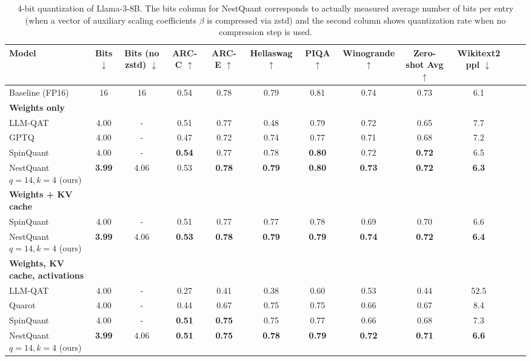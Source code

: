 \documentclass{article}
\newif\ifisicml
\theoremstyle{plain}
\theoremstyle{definition}
\theoremstyle{remark}
\begin{document}
\ifisicml
\else
\begin{table}[h]
\centering
\begin{adjustbox}{max width=\textwidth} %
\begin{tabular}{lccccccccccc}
    \toprule
\textbf{Model} & \textbf{Bits} $\downarrow$ & \textbf{Bits (no zstd)} $\downarrow$ & \textbf{ARC-C} $\uparrow$ & \textbf{ARC-E} $\uparrow$ & \textbf{Hellaswag} $\uparrow$ &  \textbf{PIQA} $\uparrow$ & \textbf{Winogrande} $\uparrow$ & \textbf{Zero-shot Avg} $\uparrow$ & \textbf{Wikitext2 ppl} $\downarrow$ \\ 
\midrule
    Baseline (FP16) & 16 & 16 & 0.54 & 0.78 & 0.79 & 0.81 & 0.74 & 0.73& 6.1\\
    \midrule
    \textbf{Weights only} \\
    LLM-QAT & 4.00 & - & 0.51 & 0.77 & 0.48 & 0.79 & 0.72 & 0.65 & 7.7\\
    GPTQ & 4.00 & - & 0.47 & 0.72 & 0.74 & 0.77 & 0.71 & 0.68 & 7.2\\
    SpinQuant          & 4.00& -&\textbf{0.54}& 0.77& 0.78 & \textbf{0.80}& 0.72& \textbf{0.72}& 6.5\\
    NestQuant $q=14,k=4$ (ours)           & \textbf{3.99}& 4.06 & 0.53 & \textbf{0.78} & \textbf{0.79} & \textbf{0.80} & \textbf{0.73} & \textbf{0.72}& \textbf{6.3}\\
    \midrule
    \textbf{Weights + KV cache} \\
    SpinQuant & 4.00& - & 0.51& 0.77& 0.77& 0.78& 0.69& 0.70& 6.6 \\
    NestQuant $q=14,k=4$ (ours)           & \textbf{3.99}& 4.06 & \textbf{0.53} & \textbf{0.78} & \textbf{0.79} &  \textbf{0.79} &\textbf{ 0.74} & \textbf{0.72}& \textbf{6.4}\\
    \midrule
    \textbf{Weights, KV cache, activations} \\
    LLM-QAT & 4.00 & - & 0.27 & 0.41 & 0.38 & 0.60 & 0.53 & 0.44 & 52.5 \\
    Quarot & 4.00& - & 0.44 & 0.67 & 0.75 & 0.75 & 0.66 & 0.67 & 8.4 \\
    SpinQuant & 4.00& - & \textbf{0.51}& \textbf{0.75}& 0.75&0.77& 0.66& 0.68& 7.3 \\
    NestQuant $q=14,k=4$ (ours)     & \textbf{3.99}& 4.06 & \textbf{0.51} & \textbf{0.75} & \textbf{0.78} & \textbf{0.79} & \textbf{0.72} & \textbf{0.71}& \textbf{6.6}\\
    \bottomrule
\end{tabular}
\end{adjustbox}
\caption{4-bit quantization of Llama-3-8B. The bits column for NestQuant corresponds to actually measured average number of bits per entry (when a vector of auxiliary scaling coefficients $\beta$ is compressed via zstd) and the second column shows quantization rate when no compression step is used.} 
\label{tab:llama3_8b}
\end{table}
\fi
\end{document}
